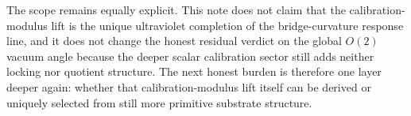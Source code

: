 \documentclass[11pt]{article}
\begin{document}
The scope remains equally explicit. This note does not claim that the calibration-modulus lift is the unique ultraviolet completion of the bridge-curvature response line, and it does not change the honest residual verdict on the global \(O(2)\) vacuum angle because the deeper scalar calibration sector still adds neither locking nor quotient structure. The next honest burden is therefore one layer deeper again: whether that calibration-modulus lift itself can be derived or uniquely selected from still more primitive substrate structure.
\end{document}
